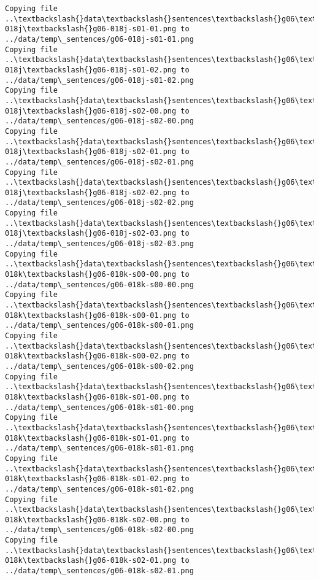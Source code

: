 \documentclass[11pt]{article}
\begin{document}
\begin{Verbatim}[commandchars=\\\{\}]
Copying file ..\textbackslash{}data\textbackslash{}sentences\textbackslash{}g06\textbackslash{}g06-018j\textbackslash{}g06-018j-s01-01.png to
../data/temp\_sentences/g06-018j-s01-01.png
Copying file ..\textbackslash{}data\textbackslash{}sentences\textbackslash{}g06\textbackslash{}g06-018j\textbackslash{}g06-018j-s01-02.png to
../data/temp\_sentences/g06-018j-s01-02.png
Copying file ..\textbackslash{}data\textbackslash{}sentences\textbackslash{}g06\textbackslash{}g06-018j\textbackslash{}g06-018j-s02-00.png to
../data/temp\_sentences/g06-018j-s02-00.png
Copying file ..\textbackslash{}data\textbackslash{}sentences\textbackslash{}g06\textbackslash{}g06-018j\textbackslash{}g06-018j-s02-01.png to
../data/temp\_sentences/g06-018j-s02-01.png
Copying file ..\textbackslash{}data\textbackslash{}sentences\textbackslash{}g06\textbackslash{}g06-018j\textbackslash{}g06-018j-s02-02.png to
../data/temp\_sentences/g06-018j-s02-02.png
Copying file ..\textbackslash{}data\textbackslash{}sentences\textbackslash{}g06\textbackslash{}g06-018j\textbackslash{}g06-018j-s02-03.png to
../data/temp\_sentences/g06-018j-s02-03.png
Copying file ..\textbackslash{}data\textbackslash{}sentences\textbackslash{}g06\textbackslash{}g06-018k\textbackslash{}g06-018k-s00-00.png to
../data/temp\_sentences/g06-018k-s00-00.png
Copying file ..\textbackslash{}data\textbackslash{}sentences\textbackslash{}g06\textbackslash{}g06-018k\textbackslash{}g06-018k-s00-01.png to
../data/temp\_sentences/g06-018k-s00-01.png
Copying file ..\textbackslash{}data\textbackslash{}sentences\textbackslash{}g06\textbackslash{}g06-018k\textbackslash{}g06-018k-s00-02.png to
../data/temp\_sentences/g06-018k-s00-02.png
Copying file ..\textbackslash{}data\textbackslash{}sentences\textbackslash{}g06\textbackslash{}g06-018k\textbackslash{}g06-018k-s01-00.png to
../data/temp\_sentences/g06-018k-s01-00.png
Copying file ..\textbackslash{}data\textbackslash{}sentences\textbackslash{}g06\textbackslash{}g06-018k\textbackslash{}g06-018k-s01-01.png to
../data/temp\_sentences/g06-018k-s01-01.png
Copying file ..\textbackslash{}data\textbackslash{}sentences\textbackslash{}g06\textbackslash{}g06-018k\textbackslash{}g06-018k-s01-02.png to
../data/temp\_sentences/g06-018k-s01-02.png
Copying file ..\textbackslash{}data\textbackslash{}sentences\textbackslash{}g06\textbackslash{}g06-018k\textbackslash{}g06-018k-s02-00.png to
../data/temp\_sentences/g06-018k-s02-00.png
Copying file ..\textbackslash{}data\textbackslash{}sentences\textbackslash{}g06\textbackslash{}g06-018k\textbackslash{}g06-018k-s02-01.png to
../data/temp\_sentences/g06-018k-s02-01.png

\end{Verbatim}
\end{document}
